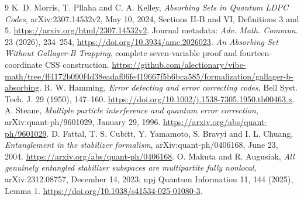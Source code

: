 \documentclass[11pt]{article}
\begin{document}
\begin{thebibliography}{9}
 K. D. Morris, T. Pllaha and C. A. Kelley,
\emph{Absorbing Sets in Quantum LDPC Codes}, arXiv:2307.14532v2,
May 10, 2024, Sections II-B and VI, Definitions 3 and 5.
\url{https://arxiv.org/html/2307.14532v2}.
Journal metadata: \emph{Adv. Math. Commun.} 23 (2026), 234--254,
\url{https://doi.org/10.3934/amc.2026023}.
 \emph{An Absorbing Set Without Gallager-B Trapping},
complete seven-variable proof and fourteen-coordinate CSS construction.
\url{https://github.com/alectionary/vibe-math/tree/ff4172b090f4d38eadaf06fe419667f5b6bca585/formalization/gallager-b-absorbing}.
 R. W. Hamming, \emph{Error detecting and error correcting
codes}, Bell Syst. Tech. J. 29 (1950), 147--160.
\url{https://doi.org/10.1002/j.1538-7305.1950.tb00463.x}.
 A. Steane, \emph{Multiple particle interference and quantum
error correction}, arXiv:quant-ph/9601029, January 29, 1996.
\url{https://arxiv.org/abs/quant-ph/9601029}.
 D. Fattal, T. S. Cubitt, Y. Yamamoto, S. Bravyi and
I. L. Chuang, \emph{Entanglement in the stabilizer formalism},
arXiv:quant-ph/0406168, June 23, 2004.
\url{https://arxiv.org/abs/quant-ph/0406168}.
 O. Makuta and R. Augusiak,
\emph{All genuinely entangled stabilizer subspaces are multipartite fully
nonlocal}, arXiv:2312.08757, December 14, 2023; npj Quantum Information 11, 144 (2025), Lemma 1.
\url{https://doi.org/10.1038/s41534-025-01080-3}.
\end{thebibliography}
\appendix

\end{document}
